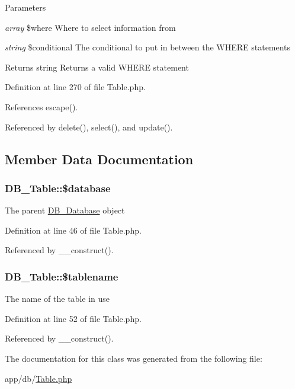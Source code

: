 \begin{DoxyParams}{Parameters}
\item[{\em array}]\$where Where to select information from \item[{\em string}]\$conditional The conditional to put in between the WHERE statements\end{DoxyParams}
\begin{DoxyReturn}{Returns}
string Returns a valid WHERE statement 
\end{DoxyReturn}


Definition at line 270 of file Table.php.

References escape().

Referenced by delete(), select(), and update().

\subsection{Member Data Documentation}
\hypertarget{classDB__Table_a41dba64f7c42ebc3a036f391b2efad71}{
\subsubsection[{\$database}]{\setlength{\rightskip}{0pt plus 5cm}DB\_\-Table::\$database}}
\label{d6/d90/classDB__Table_a41dba64f7c42ebc3a036f391b2efad71}
The parent \hyperlink{classDB__Database}{DB\_\-Database} object 

Definition at line 46 of file Table.php.

Referenced by \_\-\_\-construct().\hypertarget{classDB__Table_a3ac5f49ea8620ff9f514d767e745f14f}{
\subsubsection[{\$tablename}]{\setlength{\rightskip}{0pt plus 5cm}DB\_\-Table::\$tablename}}
\label{d6/d90/classDB__Table_a3ac5f49ea8620ff9f514d767e745f14f}
The name of the table in use 

Definition at line 52 of file Table.php.

Referenced by \_\-\_\-construct().

The documentation for this class was generated from the following file:\begin{DoxyCompactItemize}
\item 
app/db/\hyperlink{Table_8php}{Table.php}\end{DoxyCompactItemize}
